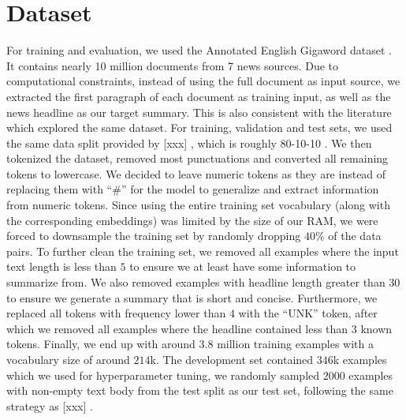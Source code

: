 \section{Dataset}
\label{sec: dataset}

For training and evaluation, we used the Annotated English Gigaword dataset . It contains nearly 10 million documents from 7 news sources. Due to computational constraints, instead of using the full document as input source, we extracted the first paragraph of each document as training input, as well as the news headline as our target summary. This is also consistent with the literature which explored the same dataset. For training, validation and test sets, we used the same data split provided by [xxx] , which is roughly 80-10-10 . We then tokenized the dataset, removed most punctuations and converted all remaining tokens to lowercase. We decided to leave numeric tokens as they are instead of replacing them with ``$\#$'' for the model to generalize and extract information from numeric tokens. Since using the entire training set vocabulary (along with the corresponding embeddings) was limited by the size of our RAM, we were forced to downsample the training set by randomly dropping $40\%$ of the data pairs. To further clean the training set, we removed all examples where the input text length is less than $5$ to ensure we at least have some information to summarize from. We also removed examples with headline length greater than $30$ to ensure we generate a summary that is short and concise. Furthermore, we replaced all tokens with frequency lower than $4$ with the ``UNK'' token, after which we removed all examples where the headline contained less than $3$ known tokens. Finally, we end up with around $3.8$ million training examples with a vocabulary size of around $214$k.  The development set contained $346$k examples which we used for hyperparameter tuning, we randomly sampled $2000$ examples with non-empty text body from the test split as our test set, following the same strategy as [xxx] .
